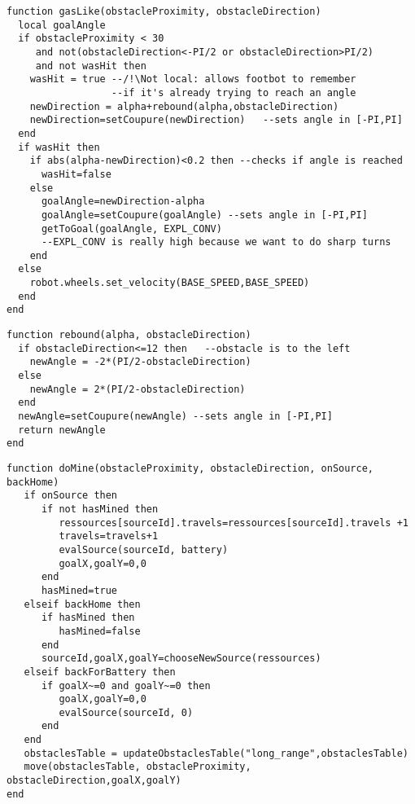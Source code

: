 \begin{subappendices}
\begin{lstlisting}[caption=Déplacement \emph{gaslike}, label=list:gaslike]
function gasLike(obstacleProximity, obstacleDirection)
  local goalAngle
  if obstacleProximity < 30
     and not(obstacleDirection<-PI/2 or obstacleDirection>PI/2)
     and not wasHit then
    wasHit = true --/!\Not local: allows footbot to remember
                  --if it's already trying to reach an angle
    newDirection = alpha+rebound(alpha,obstacleDirection)
    newDirection=setCoupure(newDirection)   --sets angle in [-PI,PI]
  end
  if wasHit then
    if abs(alpha-newDirection)<0.2 then --checks if angle is reached
      wasHit=false
    else
      goalAngle=newDirection-alpha
      goalAngle=setCoupure(goalAngle) --sets angle in [-PI,PI]
      getToGoal(goalAngle, EXPL_CONV)
      --EXPL_CONV is really high because we want to do sharp turns
    end
  else
    robot.wheels.set_velocity(BASE_SPEED,BASE_SPEED)
  end
end
\end{lstlisting}

\begin{lstlisting}[caption=Calcul de l'angle "réfléchi"]
function rebound(alpha, obstacleDirection)
  if obstacleDirection<=12 then   --obstacle is to the left
    newAngle = -2*(PI/2-obstacleDirection)
  else
    newAngle = 2*(PI/2-obstacleDirection)
  end
  newAngle=setCoupure(newAngle) --sets angle in [-PI,PI]
  return newAngle
end
\end{lstlisting}


\begin{lstlisting}[caption=fonction doMine]
function doMine(obstacleProximity, obstacleDirection, onSource, backHome)
   if onSource then
      if not hasMined then
         ressources[sourceId].travels=ressources[sourceId].travels +1
         travels=travels+1
         evalSource(sourceId, battery)
         goalX,goalY=0,0
      end
      hasMined=true
   elseif backHome then
      if hasMined then
         hasMined=false
      end
      sourceId,goalX,goalY=chooseNewSource(ressources)
   elseif backForBattery then
      if goalX~=0 and goalY~=0 then
         goalX,goalY=0,0
         evalSource(sourceId, 0)
      end
   end
   obstaclesTable = updateObstaclesTable("long_range",obstaclesTable)
   move(obstaclesTable, obstacleProximity, obstacleDirection,goalX,goalY)
end
\end{lstlisting}


\end{subappendices}
